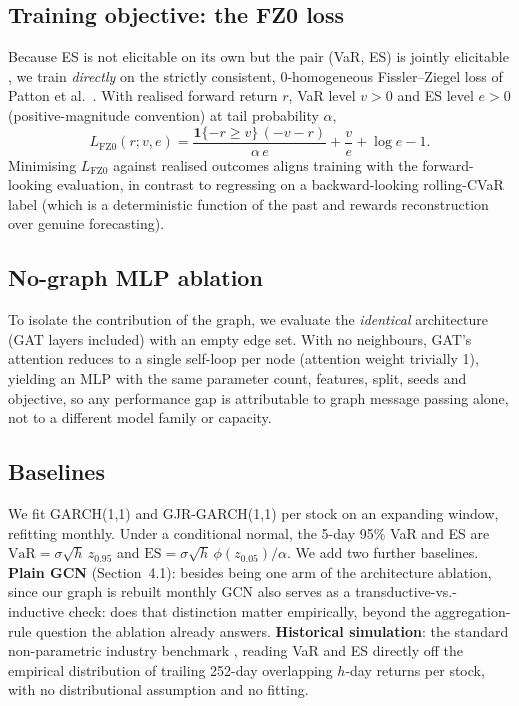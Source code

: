 \documentclass{llncs}
\begin{document}
\subsection{Training objective: the FZ0 loss}
Because ES is not elicitable on its own \citep{gneiting2011} but the pair
(VaR, ES) is jointly elicitable \citep{fissler2016}, we train \emph{directly} on
the strictly consistent, 0-homogeneous Fissler--Ziegel loss of
Patton et al.~\citep{patton2019}. With realised forward return $r$, VaR level $v>0$ and ES
level $e>0$ (positive-magnitude convention) at tail probability $\alpha$,
\begin{equation}
  L_{\mathrm{FZ0}}(r; v, e) =
  \frac{\mathbf{1}\{-r \ge v\}\,(-v - r)}{\alpha\, e}
  + \frac{v}{e} + \log e - 1 .
\end{equation}
Minimising $L_{\mathrm{FZ0}}$ against realised outcomes aligns training with the
forward-looking evaluation, in contrast to regressing on a backward-looking
rolling-CVaR label (which is a deterministic function of the past and rewards
reconstruction over genuine forecasting).

\subsection{No-graph MLP ablation}
To isolate the contribution of the graph, we evaluate the \emph{identical}
architecture (GAT layers included) with an empty edge set. With no neighbours,
GAT's attention reduces to a single self-loop per node (attention weight
trivially 1), yielding an MLP with the same parameter count, features, split,
seeds and objective, so any performance gap is attributable to graph message
passing alone, not to a different model family or capacity.

\subsection{Baselines}
We fit GARCH(1,1) \citep{bollerslev1986} and GJR-GARCH(1,1) \citep{glosten1993}
per stock on an expanding window, refitting monthly. Under a conditional normal,
the 5-day 95\% VaR and ES are
$\mathrm{VaR} = \sigma\sqrt{h}\,z_{0.95}$ and
$\mathrm{ES} = \sigma\sqrt{h}\,\phi(z_{0.05})/\alpha$.
We add two further baselines. \textbf{Plain GCN} (Section~4.1): besides being
one arm of the architecture ablation, since our graph is rebuilt monthly GCN
also serves as a transductive-vs.-inductive check: does that distinction
matter empirically, beyond the aggregation-rule question the ablation already
answers. \textbf{Historical simulation}: the standard non-parametric industry
benchmark \citep{jorion2007}, reading VaR and ES directly off the empirical
distribution of trailing 252-day overlapping $h$-day returns per stock, with
no distributional assumption and no fitting.
\end{document}

